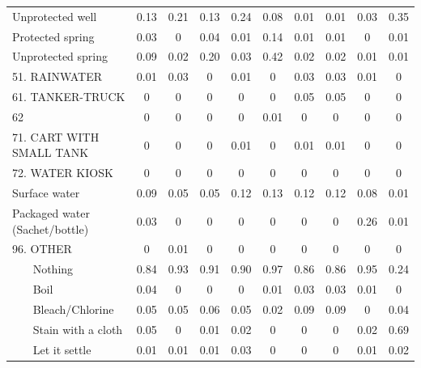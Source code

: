 \begin{table}[htbp]
\begin{tabular}{l*{9}{c}}
Unprotected well    &        0.13&        0.21&        0.13&        0.24&        0.08&        0.01&        0.01&        0.03&        0.35\\
Protected spring    &        0.03&        0&        0.04&        0.01&        0.14&        0.01&        0.01&        0&        0.01\\
Unprotected spring  &        0.09&        0.02&        0.20&        0.03&        0.42&        0.02&        0.02&        0.01&        0.01\\
51. RAINWATER       &        0.01&        0.03&        0&        0.01&        0&        0.03&        0.03&        0.01&        0\\
61. TANKER-TRUCK    &        0&        0&        0&        0&        0&        0.05&        0.05&        0&        0\\
62                  &        0&        0&        0&        0&        0.01&        0&        0&        0&        0\\
71. CART WITH SMALL TANK&        0&        0&        0&        0.01&        0&        0.01&        0.01&        0&        0\\
72. WATER KIOSK     &        0&        0&        0&        0&        0&        0&        0&        0&        0\\
Surface water       &        0.09&        0.05&        0.05&        0.12&        0.13&        0.12&        0.12&        0.08&        0.01\\
Packaged water (Sachet/bottle)&        0.03&        0&        0&        0&        0&        0&        0&        0.26&        0.01\\
96. OTHER           &        0&        0.01&        0&        0&        0&        0&        0&        0&        0\\
~~~ Nothing      &        0.84&        0.93&        0.91&        0.90&        0.97&        0.86&        0.86&        0.95&        0.24\\
~~~ Boil         &        0.04&        0&        0&        0&        0.01&        0.03&        0.03&        0.01&        0\\
~~~ Bleach/Chlorine&        0.05&        0.05&        0.06&        0.05&        0.02&        0.09&        0.09&        0&        0.04\\
~~~ Stain with a cloth&        0.05&        0&        0.01&        0.02&        0&        0&        0&        0.02&        0.69\\
~~~ Let it settle&        0.01&        0.01&        0.01&        0.03&        0&        0&        0&        0.01&        0.02\\

\end{tabular}
\end{table}
